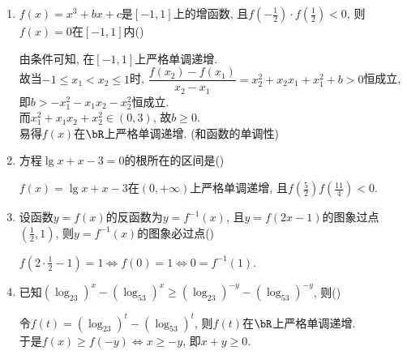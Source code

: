 \begin{enumerate}
\begin{enumerate}
\item $f(x)=x^3+bx+c$是$[-1,1]$上的增函数, 且$f(-\frac{1}{2})\cdot f(\frac{1}{2})<0$, 
则$f(x)=0$在$[-1,1]$内\dotfill()
\begin{jieda}
由条件可知, 在$[-1,1]$上严格单调递增. \\
故当$-1\leq x_1<x_2\leq 1$时, $\dfrac{f(x_2)-f(x_1)}{x_2-x_1}=x_2^2+x_2x_1+x_1^2+b>0$恒成立, 
即$b>-x_1^2-x_1x_2-x_2^2$恒成立. \\
而$x_1^2+x_1x_2+x_2^2\in(0,3)$, 故$b\geq 0$. \\
易得$f(x)$在$\bR$上严格单调递增. (和函数的单调性)
\end{jieda}


\item 方程$\lg{x}+x-3=0$的根所在的区间是\dotfill()
\begin{jieda}
$f(x)=\lg{x}+x-3$在$(0,+\infty)$上严格单调递增, 且$f(\frac{5}{2})f(\frac{11}{4})<0$. 
\end{jieda}


\item 设函数$y=f(x)$的反函数为$y=f^{-1}(x)$, 且$y=f(2x-1)$的图象过点$(\frac{1}{2},1)$, 则$y=f^{-1}(x)$的图象必过点\dotfill()
\begin{jieda}
$f(2\cdot\frac{1}{2}-1)=1\iff f(0)=1\iff 0=f^{-1}(1)$. 
\end{jieda}

\item 已知$(\log_23)^x-(\log_53)^x\geq(\log_23)^{-y}-(\log_53)^{-y}$, 则\dotfill()
\begin{jieda}
令$f(t)=(\log_23)^t-(\log_53)^t$, 则$f(t)$在$\bR$上严格单调递增. \\
于是$f(x)\geq f(-y)\iff x\geq -y$, 即$x+y\geq 0$. 
\end{jieda}



\end{enumerate}
\end{enumerate}
